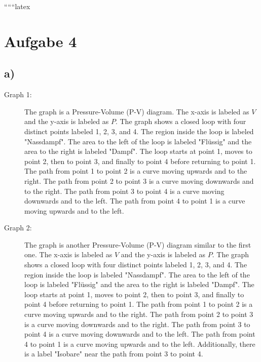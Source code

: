 
``````latex


\section*{Aufgabe 4}

\subsection*{a)}

\begin{description}
    \item[Graph 1:] 
    The graph is a Pressure-Volume (P-V) diagram. The x-axis is labeled as $V$ and the y-axis is labeled as $P$. The graph shows a closed loop with four distinct points labeled 1, 2, 3, and 4. The region inside the loop is labeled "Nassdampf". The area to the left of the loop is labeled "Flüssig" and the area to the right is labeled "Dampf". The loop starts at point 1, moves to point 2, then to point 3, and finally to point 4 before returning to point 1. The path from point 1 to point 2 is a curve moving upwards and to the right. The path from point 2 to point 3 is a curve moving downwards and to the right. The path from point 3 to point 4 is a curve moving downwards and to the left. The path from point 4 to point 1 is a curve moving upwards and to the left.
    
    \item[Graph 2:] 
    The graph is another Pressure-Volume (P-V) diagram similar to the first one. The x-axis is labeled as $V$ and the y-axis is labeled as $P$. The graph shows a closed loop with four distinct points labeled 1, 2, 3, and 4. The region inside the loop is labeled "Nassdampf". The area to the left of the loop is labeled "Flüssig" and the area to the right is labeled "Dampf". The loop starts at point 1, moves to point 2, then to point 3, and finally to point 4 before returning to point 1. The path from point 1 to point 2 is a curve moving upwards and to the right. The path from point 2 to point 3 is a curve moving downwards and to the right. The path from point 3 to point 4 is a curve moving downwards and to the left. The path from point 4 to point 1 is a curve moving upwards and to the left. Additionally, there is a label "Isobare" near the path from point 3 to point 4.
    

\end{description}
